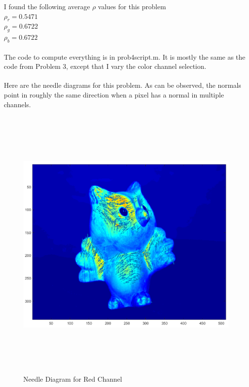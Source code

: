 \documentclass[11pt,psfig]{article}
\begin{document}
I found the following average $\rho$ values for this problem\\
$\rho_r = 0.5471$\\
$\rho_g = 0.6722$\\
$\rho_b = 0.6722$\\
\\
The code to compute everything is in prob4script.m. It is mostly the same as the code from Problem 3, except that I vary the color channel selection. \\
\\
Here are the needle diagrams for this problem. As can be observed, the normals point in roughly the same direction when a pixel has a normal in multiple channels. 
\begin{figure}[H]
\centering
\includegraphics[height=5.5in]{prob4needlePlot1.png}
\caption{Needle Diagram for Red Channel}
\end{figure}
\end{document}
